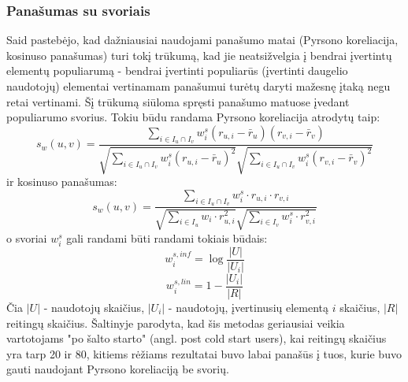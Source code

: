 \documentclass{VUMIFInfMagistrinis}
\begin{document}
\subsubsection{Panašumas su svoriais}
\cite{13} Said pastebėjo, kad dažniausiai naudojami panašumo matai (Pyrsono koreliacija, kosinuso panašumas) turi tokį trūkumą, kad jie neatsižvelgia į bendrai įvertintų elementų populiarumą - bendrai įvertinti populiarūs (įvertinti daugelio naudotojų) elementai vertinamam panašumui turėtų daryti mažesnę įtaką negu retai vertinami. Šį trūkumą siūloma spręsti panašumo matuose įvedant populiarumo svorius.
\newline
\indent
Tokiu būdu randama Pyrsono koreliacija atrodytų taip:
\begin{equation}
s_w(u,v) = \frac{\sum \limits_{i\in I_u \cap I_v }w_i^s(r_{u,i}-\bar{r}_u)(r_{v,i}-\bar{r}_v)}{\sqrt{\sum\limits_{i \in I_u \cap I_v }w_i^s(r_{u,i} - \bar{r}_u)^2}\sqrt{\sum\limits_{i \in I_u \cap I_v }w_i^s(r_{v,i} - \bar{r}_v)^2}}
\end{equation}
ir kosinuso panašumas:
\begin{equation}
s_w(u,v) = \frac{\sum \limits_{i\in I_u \cap I_v} w_i^s \cdot r_{u,i} \cdot r_{v,i}}{\sqrt{\sum\limits_{i \in I_u} w_i \cdot r_{u,i}^2}\sqrt{\sum\limits_{i \in I_v} w_i^s \cdot r_{v,i}^2}}
\end{equation}
o svoriai $w_i^s$ gali randami būti randami tokiais būdais:
\begin{equation}
w_i^{s,inf} = \log \frac{|U|}{|U_i|}
\end{equation}
\begin{equation}
w_i^{s,lin} = 1 - \frac{|U_i|}{|R|}
\end{equation}
Čia $|U|$ - naudotojų skaičius, $|U_i|$ - naudotojų, įvertinusių elementą $i$ skaičius, $|R|$ reitingų skaičius.
\newline
\indent
Šaltinyje \cite{13} parodyta, kad šis metodas geriausiai veikia vartotojams "po šalto starto" (angl. post cold start users), kai reitingų skaičius yra tarp 20 ir 80, kitiems rėžiams rezultatai buvo labai panašūs į tuos, kurie buvo gauti naudojant Pyrsono koreliaciją be svorių.  
\end{document}
